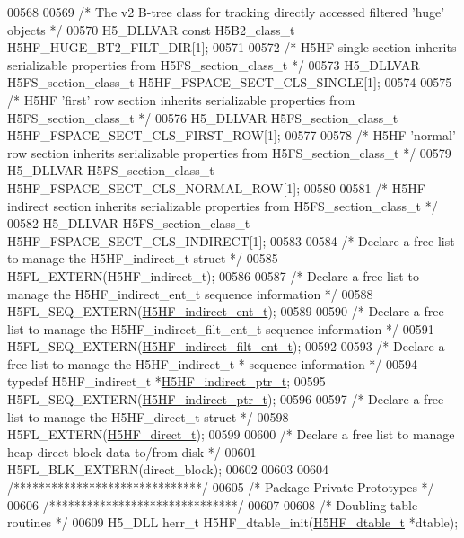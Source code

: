 \begin{DoxyCode}
00568 
00569 \textcolor{comment}{/* The v2 B-tree class for tracking directly accessed filtered 'huge' objects */}
00570 H5\_DLLVAR \textcolor{keyword}{const} H5B2\_class\_t H5HF\_HUGE\_BT2\_FILT\_DIR[1];
00571 
00572 \textcolor{comment}{/* H5HF single section inherits serializable properties from H5FS\_section\_class\_t */}
00573 H5\_DLLVAR H5FS\_section\_class\_t H5HF\_FSPACE\_SECT\_CLS\_SINGLE[1];
00574 
00575 \textcolor{comment}{/* H5HF 'first' row section inherits serializable properties from H5FS\_section\_class\_t */}
00576 H5\_DLLVAR H5FS\_section\_class\_t H5HF\_FSPACE\_SECT\_CLS\_FIRST\_ROW[1];
00577 
00578 \textcolor{comment}{/* H5HF 'normal' row section inherits serializable properties from H5FS\_section\_class\_t */}
00579 H5\_DLLVAR H5FS\_section\_class\_t H5HF\_FSPACE\_SECT\_CLS\_NORMAL\_ROW[1];
00580 
00581 \textcolor{comment}{/* H5HF indirect section inherits serializable properties from H5FS\_section\_class\_t */}
00582 H5\_DLLVAR H5FS\_section\_class\_t H5HF\_FSPACE\_SECT\_CLS\_INDIRECT[1];
00583 
00584 \textcolor{comment}{/* Declare a free list to manage the H5HF\_indirect\_t struct */}
00585 H5FL\_EXTERN(H5HF\_indirect\_t);
00586 
00587 \textcolor{comment}{/* Declare a free list to manage the H5HF\_indirect\_ent\_t sequence information */}
00588 H5FL\_SEQ\_EXTERN(\hyperlink{struct_h5_h_f__indirect__ent__t}{H5HF\_indirect\_ent\_t});
00589 
00590 \textcolor{comment}{/* Declare a free list to manage the H5HF\_indirect\_filt\_ent\_t sequence information */}
00591 H5FL\_SEQ\_EXTERN(\hyperlink{struct_h5_h_f__indirect__filt__ent__t}{H5HF\_indirect\_filt\_ent\_t});
00592 
00593 \textcolor{comment}{/* Declare a free list to manage the H5HF\_indirect\_t * sequence information */}
00594 \textcolor{keyword}{typedef} H5HF\_indirect\_t *\hyperlink{struct_h5_h_f__indirect__t}{H5HF\_indirect\_ptr\_t};
00595 H5FL\_SEQ\_EXTERN(\hyperlink{struct_h5_h_f__indirect__t}{H5HF\_indirect\_ptr\_t});
00596 
00597 \textcolor{comment}{/* Declare a free list to manage the H5HF\_direct\_t struct */}
00598 H5FL\_EXTERN(\hyperlink{struct_h5_h_f__direct__t}{H5HF\_direct\_t});
00599 
00600 \textcolor{comment}{/* Declare a free list to manage heap direct block data to/from disk */}
00601 H5FL\_BLK\_EXTERN(direct\_block);
00602 
00603 
00604 \textcolor{comment}{/******************************/}
00605 \textcolor{comment}{/* Package Private Prototypes */}
00606 \textcolor{comment}{/******************************/}
00607 
00608 \textcolor{comment}{/* Doubling table routines */}
00609 H5\_DLL herr\_t H5HF\_dtable\_init(\hyperlink{struct_h5_h_f__dtable__t}{H5HF\_dtable\_t} *dtable);

\end{DoxyCode}
